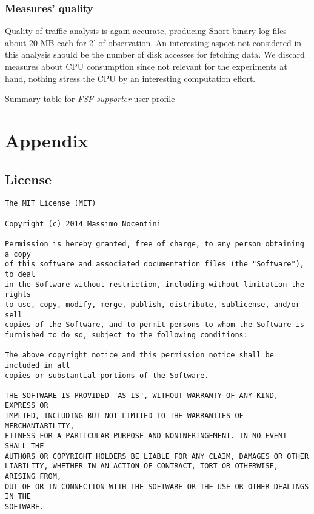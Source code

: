 \documentclass[10pt,a4paper]{article}
\begin{document}
    \subsubsection*{Measures' quality}
    Quality of traffic analysis is again accurate, producing Snort
    binary log files about 20 MB each for 2' of observation. An
    interesting aspect not considered in this analysis should be the
    number of disk accesses for fetching data. We discard measures
    about CPU consumption since not relevant for the experiments at
    hand, nothing stress the CPU by an interesting computation effort.

    \begin{table}
      \begin{adjustwidth}{-2cm}{}
        
      \end{adjustwidth}
      \caption{Summary table for \emph{FSF supporter} user profile}
      \label{fig:FSF-supporter-user-profile}
    \end{table}


    \newpage

    \section{Appendix}
    \label{sec:appendix}

    \subsection{License}
\begin{verbatim}
The MIT License (MIT)

Copyright (c) 2014 Massimo Nocentini

Permission is hereby granted, free of charge, to any person obtaining a copy
of this software and associated documentation files (the "Software"), to deal
in the Software without restriction, including without limitation the rights
to use, copy, modify, merge, publish, distribute, sublicense, and/or sell
copies of the Software, and to permit persons to whom the Software is
furnished to do so, subject to the following conditions:

The above copyright notice and this permission notice shall be included in all
copies or substantial portions of the Software.

THE SOFTWARE IS PROVIDED "AS IS", WITHOUT WARRANTY OF ANY KIND, EXPRESS OR
IMPLIED, INCLUDING BUT NOT LIMITED TO THE WARRANTIES OF MERCHANTABILITY,
FITNESS FOR A PARTICULAR PURPOSE AND NONINFRINGEMENT. IN NO EVENT SHALL THE
AUTHORS OR COPYRIGHT HOLDERS BE LIABLE FOR ANY CLAIM, DAMAGES OR OTHER
LIABILITY, WHETHER IN AN ACTION OF CONTRACT, TORT OR OTHERWISE, ARISING FROM,
OUT OF OR IN CONNECTION WITH THE SOFTWARE OR THE USE OR OTHER DEALINGS IN THE
SOFTWARE.
\end{verbatim}
\end{document}
